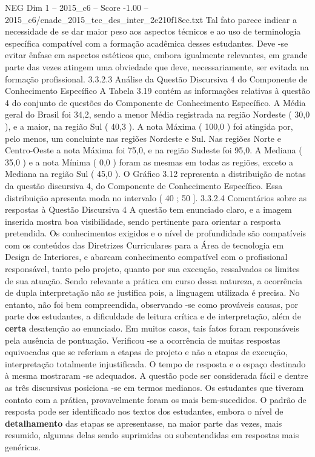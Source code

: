 \begin{textsample}{NEG Dim 1 – 2015\_c6 – Score -1.00 – 2015\_c6/enade\_2015\_tec\_des\_inter\_2e210f18ec.txt}
Tal fato parece indicar a necessidade de se dar maior peso aos aspectos técnicos e ao uso de terminologia específica compatível com a formação acadêmica desses estudantes.
Deve -se evitar ênfase em aspectos estéticos que, embora igualmente relevantes, em grande parte das vezes atingem uma obviedade que deve, necessariamente, ser evitada na formação profissional. 3.3.2.3 Análise da Questão Discursiva 4 do Componente de Conhecimento Específico A Tabela 3.19 contém as informações relativas à questão 4 do conjunto de questões do Componente de Conhecimento Específico.
A Média geral do Brasil foi 34,2, sendo a menor Média registrada na região Nordeste ( 30,0 ), e a maior, na região Sul ( 40,3 ).
A nota Máxima ( 100,0 ) foi atingida por, pelo menos, um concluinte nas regiões Nordeste e Sul.
Nas regiões Norte e Centro-Oeste a nota Máxima foi 75,0, e na região Sudeste foi 95,0.
A Mediana ( 35,0 ) e a nota Mínima ( 0,0 ) foram as mesmas em todas as regiões, exceto a Mediana na região Sul ( 45,0 ).
O Gráfico 3.12 representa a distribuição de notas da questão discursiva 4, do Componente de Conhecimento Específico.
Essa distribuição apresenta moda no intervalo ( 40 ; 50 ]. 3.3.2.4 Comentários sobre as respostas à Questão Discursiva 4 A questão tem enunciado claro, e a imagem inserida mostra boa visibilidade, sendo pertinente para orientar a resposta pretendida.
Os conhecimentos exigidos e o nível de profundidade são compatíveis com os conteúdos das Diretrizes Curriculares para a Área de tecnologia em Design de Interiores, e abarcam conhecimento compatível com o profissional responsável, tanto pelo projeto, quanto por sua execução, ressalvados os limites de sua atuação.
Sendo relevante a prática em curso dessa natureza, a ocorrência de dupla interpretação não se justifica pois, a linguagem utilizada é precisa.
No entanto, não foi bem compreendida, observando -se como prováveis causas, por parte dos estudantes, a dificuldade de leitura crítica e de interpretação, além de \textbf{certa} desatenção ao enunciado.
Em muitos casos, tais fatos foram responsáveis pela ausência de pontuação.
Verificou -se a ocorrência de muitas respostas equivocadas que se referiam a etapas de projeto e não a etapas de execução, interpretação totalmente injustificada.
O tempo de resposta e o espaço destinado à mesma mostraram -se adequados.
A questão pode ser considerada fácil e dentre as três discursivas posiciona -se em termos medianos.
Os estudantes que tiveram contato com a prática, provavelmente foram os mais bem-sucedidos.
O padrão de resposta pode ser identificado nos textos dos estudantes, embora o nível de \textbf{detalhamento} das etapas se apresentasse, na maior parte das vezes, mais resumido, algumas delas sendo suprimidas ou subentendidas em respostas mais genéricas.

\end{textsample}
